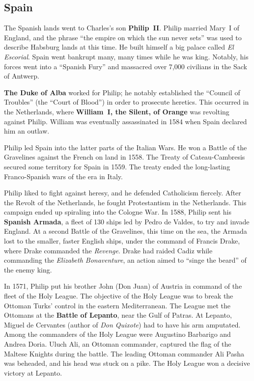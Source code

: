 \subsection*{Spain}

The Spanish lands went to Charles's son \textbf{Philip~II}.
Philip married Mary~I of England, and the phrase ``the empire on which the sun never sets''
was used to describe Habsburg lands at this time.
He built himself a big palace called \textit{El Escorial}.
Spain went bankrupt many, many times while he was king.
Notably, his forces went into a ``Spanish Fury'' and massacred over 7,000 civilians in the Sack of Antwerp.

\textbf{The Duke of Alba} worked for Philip;
he notably established the ``Council of Troubles'' (the ``Court of Blood'') in order to prosecute heretics.
This occurred in the Netherlands, where \textbf{William~I, the Silent, of Orange} was revolting against Philip.
William was eventually assassinated in 1584 when Spain declared him an outlaw.

Philip led Spain into the latter parts of the Italian Wars.
He won a Battle of the Gravelines against the French on land in 1558.
The Treaty of Cateau-Cambresis secured some territory for Spain in 1559.
The treaty ended the long-lasting Franco-Spanish wars of the era in Italy.

Philip liked to fight against heresy, and he defended Catholicism fiercely.
After the Revolt of the Netherlands, he fought Protestantism in the Netherlands.
This campaign ended up spiraling into the Cologne War.
In 1588, Philip sent his \textbf{Spanish Armada}, a fleet of 130 ships led by Pedro de Valdes,
to try and invade England.
At a second Battle of the Gravelines, this time on the sea,
the Armada lost to the smaller, faster English ships, under the command of Francis Drake,
where Drake commanded the \textit{Revenge}.
Drake had raided Cadiz while commanding the \textit{Elizabeth Bonaventure},
an action aimed to ``singe the beard'' of the enemy king.

In 1571, Philip put his brother John (Don Juan) of Austria in command of the fleet of the Holy League.
The objective of the Holy League was to break the Ottoman Turks' control in the eastern Mediterranean.
The League met the Ottomans at the \textbf{Battle of Lepanto}, near the Gulf of Patras.
At Lepanto, Miguel de Cervantes (author of \textit{Don Quixote}) had to have his arm amputated.
Among the commanders of the Holy League were Augustino Barbarigo and Andrea Doria.
Uluch Ali, an Ottoman commander, captured the flag of the Maltese Knights during the battle.
The leading Ottoman commander Ali Pasha was beheaded, and his head was stuck on a pike.
The Holy League won a decisive victory at Lepanto.

